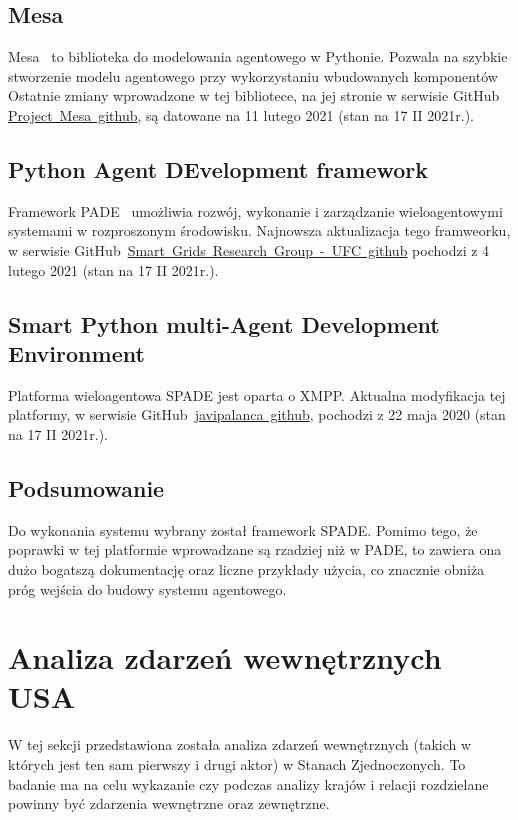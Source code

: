\documentclass[11pt]{report}
\begin{document}
    \subsection{Mesa}
    Mesa~\cite{Masad2015} to biblioteka do modelowania agentowego w Pythonie.
    Pozwala na szybkie stworzenie modelu agentowego przy wykorzystaniu wbudowanych komponentów
    Ostatnie zmiany wprowadzone w tej bibliotece, na jej stronie w serwisie GitHub \href{https://github.com/projectmesa/mesa}{Project~Mesa~github}, są datowane na 11 lutego 2021 (stan na 17 II 2021r.).

    \subsection{Python Agent DEvelopment framework}
    Framework PADE~\cite{Melo2019} umożliwia rozwój, wykonanie i zarządzanie wieloagentowymi systemami w rozproszonym środowisku.
    Najnowsza aktualizacja tego framweorku, w serwisie GitHub~\href{https://github.com/grei-ufc/pade}{Smart~Grids~Research~Group~-~UFC~github} pochodzi z 4 lutego 2021 (stan na 17 II 2021r.).

    \subsection{Smart Python multi-Agent Development Environment}
    Platforma wieloagentowa SPADE jest oparta o XMPP\cite{Saint-Andre2007}.
    Aktualna modyfikacja tej platformy, w serwisie GitHub~\href{https://github.com/javipalanca/spade}{javipalanca~github}, pochodzi z 22 maja 2020 (stan na 17 II 2021r.).

    \subsection{Podsumowanie}
    Do wykonania systemu wybrany został framework SPADE\@.
    Pomimo tego, że poprawki w tej platformie wprowadzane są rzadziej niż w PADE, to zawiera ona dużo bogatszą dokumentację
    oraz liczne przykłady użycia, co znacznie obniża próg wejścia do budowy systemu agentowego.


    \section{Analiza zdarzeń wewnętrznych USA}
    W tej sekcji przedstawiona została analiza zdarzeń wewnętrznych (takich w których jest ten sam pierwszy i drugi aktor) w Stanach Zjednoczonych.
    To badanie ma na celu wykazanie czy podczas analizy krajów i relacji rozdzielane powinny być zdarzenia wewnętrzne oraz zewnętrzne.
\end{document}
